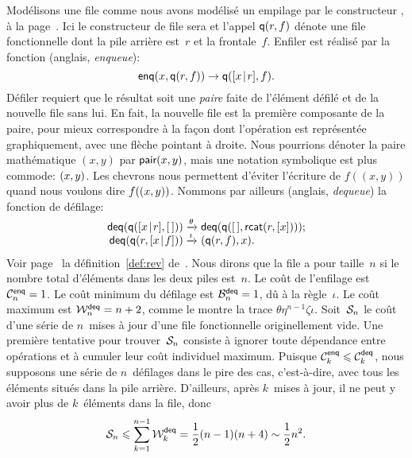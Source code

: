 Modélisons une file comme nous avons modélisé un empilage par le
constructeur , à la
page~\pageref{par:stacks}. Ici le constructeur de file sera
 et l'appel \(\fun{q}(r,f)\) dénote une
file fonctionnelle dont la pile arrière est~\(r\) et la
frontale~\(f\). Enfiler est réalisé par la fonction
 (anglais, \emph{enqueue}):
\begin{equation}
\fun{enq}(x,\fun{q}(r,f)) \rightarrow \fun{q}(\cons{x}{r},f).
\label{def:enq}
\end{equation}
Défiler requiert que le résultat soit une \emph{paire} faite de l'élément défilé et de la nouvelle file
sans lui. En fait, la nouvelle file est la première composante de la
paire, pour mieux correspondre à la façon dont l'opération est
représentée graphiquement, avec une flèche pointant à droite. Nous
pourrions dénoter la paire mathématique \((x,y)\) par
\(\fun{pair}(x,y)\), mais une notation symbolique est plus commode:
\(\pair{x}{y}\). Les chevrons nous permettent d'éviter l'écriture de
\(f((x,y))\) quand nous voulons dire \(f(\pair{x}{y})\). Nommons par
ailleurs  (anglais, \emph{dequeue})
la fonction de défilage:
\begin{equation}
\begin{array}{@{}r@{\;}l@{\;}l@{}}
  \fun{deq}(\fun{q}(\cons{x}{r},\el))
& \xrightarrow{\smash{\theta}}
& \fun{deq}(\fun{q}(\el,\fun{rcat}(r,[x])));\\
  \fun{deq}(\fun{q}(r,\cons{x}{f}))
& \xrightarrow{\smash{\iota}}
& \pair{\fun{q}(r,f)}{x}.
\end{array}
\label{def:deq}
\end{equation}
Voir page~\pageref{def:rev} la définition~\eqref{def:rev}
de~. Nous dirons que la file a
pour taille~\(n\) si le nombre total d'éléments dans les deux piles
est~\(n\).  Le coût de l'enfilage est
\(\C{\fun{enq}}{n} = 1\). Le coût
minimum du défilage est
\(\B{\fun{deq}}{n} = 1\), dû à la règle~\(\iota\). Le coût maximum est
\(\W{\fun{deq}}{n} = n+2\), comme le montre la trace
\(\theta\eta^{n-1}\zeta\iota\). Soit~\(\A{n}\) le coût d'une série de
\(n\)~mises à jour d'une file fonctionnelle originellement vide. Une
première tentative pour trouver~\(\A{n}\) consiste à ignorer toute
dépendance entre opérations et à cumuler leur coût individuel
maximum. Puisque \(\C{\fun{enq}}{k} \leqslant \C{\fun{deq}}{k}\), nous
supposons une série de \(n\)~défilages dans le pire des cas,
c'est-à-dire, avec tous les éléments situés dans la pile
arrière. D'ailleurs, après \(k\)~mises à jour, il ne peut y avoir plus
de \(k\)~éléments dans la file, donc
\begin{equation*}
\A{n} \leqslant \sum_{k=1}^{n-1}{\W{\fun{deq}}{k}} =
\frac{1}{2}{(n-1)(n+4)} \sim \frac{1}{2}{n^2}.
\end{equation*}

